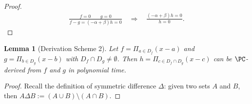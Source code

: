 \documentclass[11pt]{article}
\newtheorem{lemma}[theorem]{Lemma}
\begin{document}
\begin{proof}
    \begin{align*}
        \frac{f=0 \qquad g=0}{f-g = (-\alpha + \beta) h =0} \quad \Rightarrow \quad \frac{(-\alpha + \beta)h = 0}{h = 0}.
    \end{align*}
\end{proof}

\begin{lemma}[Derivation Scheme 2]\label{th:derivation_scheme_2}
    Let $f = \Pi_{a \in D_f} (x-a)$ and $g = \Pi_{b \in D_g}(x-b)$ with $D_f \cap D_g \neq \emptyset$. Then $h = \Pi_{c \in D_f \cap D_g}(x-c)$ can be $\PC$-derived from $f$ and $g$ in polynomial time.
\end{lemma}

\begin{proof}
    Recall the definition of symmetric difference $\Delta$: given two sets $A$ and $B$, then $A \Delta B := (A \cup B) \setminus (A \cap B)$.


\end{proof}
\end{document}
